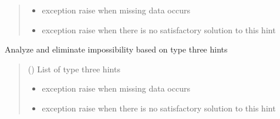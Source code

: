 \documentclass[letterpaper,10pt,english]{sphinxmanual}
\begin{document}
\begin{fulllineitems}
\begin{fulllineitems}
\begin{quote}
\begin{description}
\begin{itemize}
\item {} 
\sphinxAtStartPar
{} \textendash{} exception \sphinxhyphen{} raise when missing data occurs

\item {} 
\sphinxAtStartPar
{} \textendash{} exception \sphinxhyphen{} raise when there is no             satisfactory solution to this hint

\end{itemize}

\end{description}\end{quote}

\end{fulllineitems}


\begin{fulllineitems}
\label{\detokenize{condition_analysis:condition_analysis.CondBoard.rightCond}}
\pysigstartsignatures
{}
\pysigstopsignatures
\sphinxAtStartPar
Analyze and eliminate impossibility based on type three hints
\begin{quote}\begin{description}
\sphinxAtStartPar
{} () \textendash{} List of type three hints

\begin{itemize}
\item {} 
\sphinxAtStartPar
{} \textendash{} exception \sphinxhyphen{} raise when missing data occurs

\item {} 
\sphinxAtStartPar
{} \textendash{} exception \sphinxhyphen{} raise when there is no             satisfactory solution to this hint

\end{itemize}

\end{description}\end{quote}


\end{fulllineitems}
\end{fulllineitems}
\end{document}
